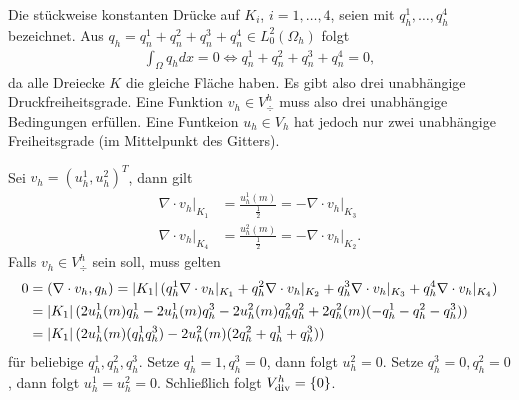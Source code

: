 Die stückweise konstanten Drücke auf $K_{i}$, $i = 1, \dots, 4$, seien mit $q_{h}^{1}, \dots, q_{h}^{4}$ bezeichnet. 
Aus $q_{h} =  q_{n}^{1} + q_{n}^{2} + q_{n}^{3}+ q_{n}^{4} \in L_{0}^{2} (\Omega_{h}) $  folgt
\begin{align*}
  \int_{\Omega} q_{h} dx = 0 \iff q_{n}^{1} + q_{n}^{2} + q_{n}^{3}+ q_{n}^{4} = 0, 
\end{align*}
da alle Dreiecke $K$ die gleiche Fläche haben. Es gibt also drei unabhängige Druckfreiheitsgrade. Eine Funktion $v_{h} \in V_{\div}^{h}$ muss also drei unabhängige Bedingungen erfüllen. Eine Funtkeion $u_{h} \in V_{h}$ hat jedoch nur zwei unabhängige Freiheitsgrade (im Mittelpunkt des Gitters). 

Sei $v_{h} = (u_{h}^{1}, u_{h}^{2})^{T}$, dann gilt
\begin{align*}
  \nabla\cdot v_{h}|_{K_{1}} &= \frac {u_{h}^{1} (m)} {\frac 12} = - \nabla\cdot v_{h}|_{K_{3}}\\
  \nabla\cdot v_{h}|_{K_{4}} &= \frac {u_{h}^{2} (m)} {\frac 12} = - \nabla\cdot v_{h}|_{K_{2}}. 
\end{align*} 
Falls $v_{h} \in V_{\div}^{h}$ sein soll, muss gelten
\begin{align*}
   0&= ( \nabla\cdot v_{h}, q_{h}) = \left|K_{1}\right| (q_{h}^{1} \nabla\cdot v_{h}|_{K_{1}} + q_{h}^{2} \nabla\cdot v_{h}|_{K_{2}} + q_{h}^{3} \nabla\cdot v_{h}|_{K_{3}} + q_{h}^{4} \nabla\cdot v_{h}|_{K_{4}})\\
&=\left|K_{1}\right| (2 u_{h}^{1} (m)q_{h}^{1} - 2 u_{h}^{1}(m)q_{h}^{3} - 2 u_{h}^{2}(m) q_{h}^{2} q_{h}^{2} + 2 q_{h}^{2}(m) (- q_{h}^{1} - q_{h}^{2} - q_{h}^{3}))\\
&=\left|K_{1}\right| (2 u_{h}^{1} (m)(q_{h}^{1} q_{h}^{3}) - 2 u_{h}^{2}(m)(2q_{h}^{2} + q_{h}^{1} + q_{h}^{3}))
\end{align*}
für beliebige $q_{h}^{1},q_{h}^{2},q_{h}^{3}$. Setze $q_{h}^{1} = 1, q_{h}^{3} = 0$, dann folgt $u_{h}^{2} = 0$. Setze $q_{h}^{3} = 0, q_{h}^{2} = 0$, dann folgt $u_{h}^{1} = u_{h}^{2} = 0$. Schließlich folgt $V_{\operatorname{div}}^{h} = \left\{ 0 \right\}$.
